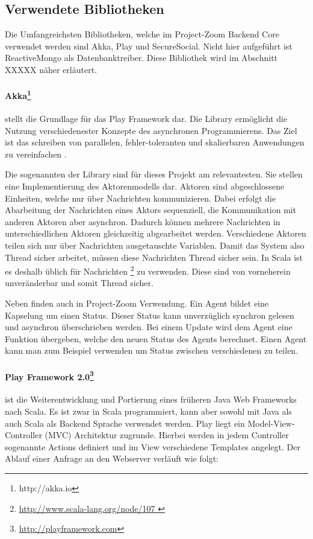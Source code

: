 \subsection{Verwendete Bibliotheken}
Die Umfangreichsten Bibliotheken, welche im Project-Zoom Backend Core verwendet werden sind Akka, Play und SecureSocial. Nicht hier aufgeführt ist ReactiveMongo als Datenbanktreiber. Diese Bibliothek wird im Abschnitt XXXXX näher erläutert. 

\paragraph{Akka\footnote{http://akka.io}} stellt die Grundlage für das Play Framework dar. Die Library ermöglicht die Nutzung verschiedenester Konzepte des asynchronen Programmierens. Das Ziel ist das schreiben von parallelen, fehler-toleranten und skalierbaren Anwendungen zu vereinfachen \cite{what-is-akka}. 

Die sogenannten  der Library sind für dieses Projekt am relevantesten. Sie stellen eine Implementierung des Aktorenmodells dar. Aktoren sind abgeschlossene Einheiten, welche nur über Nachrichten kommunizieren. Dabei erfolgt die Abarbeitung der Nachrichten eines Aktors sequenziell, die Kommunikation mit anderen Aktoren aber asynchron. Dadurch können mehrere Nachrichten in unterschiedlichen Aktoren gleichzeitig abgearbeitet werden. Verschiedene Aktoren teilen sich nur über Nachrichten ausgetauschte Variablen. Damit das System also Thread sicher arbeitet, müssen diese Nachrichten Thread sicher sein. In Scala ist es deshalb üblich für Nachrichten \footnote{\url{ http://www.scala-lang.org/node/107 }} zu verwenden. Diese sind von vorneherein unveränderbar und somit Thread sicher.

Neben  finden auch  in Project-Zoom Verwendung. Ein Agent bildet eine Kapselung um einen Status. Dieser Status kann unverzüglich synchron gelesen und asynchron überschrieben werden. Bei einem Update wird dem Agent eine Funktion übergeben, welche den neuen Status des Agents berechnet. Einen Agent kann man zum Beispiel verwenden um Status zwischen verschiedenen  zu teilen.

\paragraph{Play Framework 2.0\footnote{\url{http://playframework.com}}} ist die Weiterentwicklung  und Portierung eines früheren Java Web Frameworks nach Scala. Es ist zwar in Scala programmiert, kann aber sowohl mit Java als auch Scala als Backend Sprache verwendet werden. Play liegt ein Model-View-Controller (MVC) Architektur zugrunde. Hierbei werden in jedem Controller sogenannte Actions definiert und im View verschiedene Templates angelegt. Der Ablauf einer Anfrage an den Webserver verläuft wie folgt:


